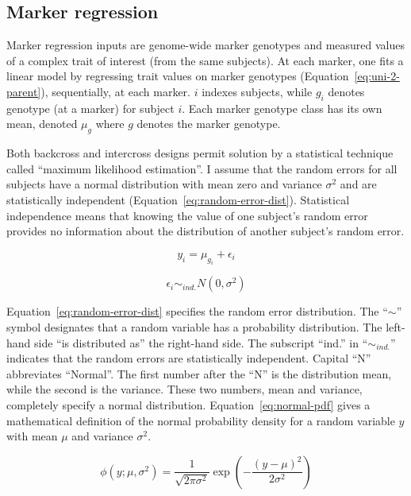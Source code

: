 \documentclass[oneside]{book}\usepackage[]{graphicx}\usepackage[]{color}
\begin{document}
\subsection{Marker regression}\label{sec:marker-regression}

Marker regression inputs are genome-wide marker genotypes and measured values of a 
complex trait of interest (from the same subjects). 
At each marker, one fits a linear model by regressing trait values on marker 
genotypes (Equation~\ref{eq:uni-2-parent}), sequentially, at each marker. $i$ indexes subjects, while $g_i$ denotes genotype (at a marker) for subject $i$. Each marker genotype class has its own mean, denoted $\mu_{g}$ where $g$ denotes the marker genotype.


Both backcross and intercross designs 
permit solution by a statistical technique called ``maximum likelihood estimation''. I assume that the random errors for 
all subjects have a normal distribution with mean zero and variance $\sigma^2$ and are statistically independent (Equation~\ref{eq:random-error-dist}). Statistical 
independence means that knowing the value of one subject's random error provides no 
information about the distribution of another subject's random error.


\begin{equation}
y_i = \mu_{g_i} + \epsilon_i
\label{eq:uni-2-parent}
\end{equation}

\begin{equation}
\epsilon_i \sim_{ind.} N(0, \sigma^2)
\label{eq:random-error-dist}
\end{equation}

Equation~\ref{eq:random-error-dist} specifies the random error distribution. 
The ``$\sim$'' symbol designates that a random variable has a probability distribution. The left-hand
side ``is distributed as'' the right-hand side. The subscript ``ind.'' in ``$\sim_{ind.}$'' indicates that the random errors are statistically independent. 
Capital ``N'' abbreviates ``Normal''. The first number after 
the ``N'' is the distribution mean, while the second is the variance.
These two numbers, mean 
and variance, completely specify a normal distribution.
Equation~\ref{eq:normal-pdf} gives a mathematical definition of the normal 
probability density for a random variable $y$ with mean $\mu$ and variance $\sigma^2$. 

\begin{equation}
\phi(y; \mu, \sigma^2) = \frac{1}{\sqrt{2\pi\sigma^2}}\exp{(- \frac{(y - \mu)^2}{2\sigma^2})}
\label{eq:normal-pdf}
\end{equation}
\end{document}
